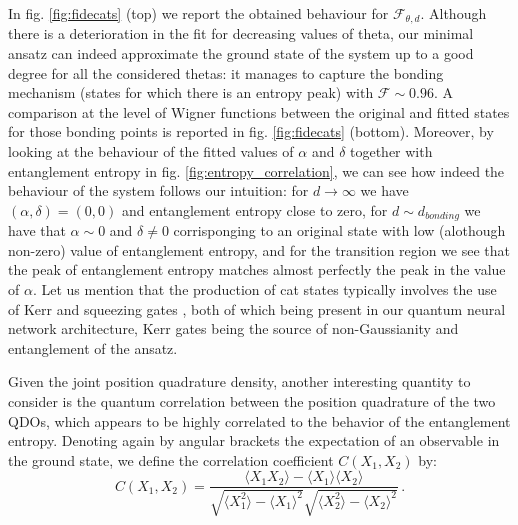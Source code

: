 \documentclass[reprint, amsmath, amssymb, floatfix, aps, pra]{revtex4-2}
\begin{document}
    In fig. \ref{fig:fidecats} (top) we report the obtained behaviour for $\mathcal{F}_{\theta, d}$. Although there is a deterioration in the fit for decreasing values of theta, our minimal ansatz can indeed approximate the ground state of the system up to a good degree for all the considered thetas: it manages to capture the bonding mechanism (states for which there is an entropy peak) with $\mathcal{F}\sim 0.96$. A comparison at the level of Wigner functions between the original and fitted states for those bonding points is reported in fig. \ref{fig:fidecats} (bottom). Moreover, by looking at the behaviour of the fitted values of $\alpha$ and $\delta$ together with entanglement entropy in fig. \ref{fig:entropy_correlation}, we can see how indeed the behaviour of the system follows our intuition: for $d\rightarrow\infty$ we have $(\alpha, \delta) = (0,0)$ and entanglement entropy close to zero, for $d\sim d_{bonding}$ we have that $\alpha \sim 0$ and $\delta\neq 0$ corrisponging to an original state with low (alothough non-zero) value of entanglement entropy, and for the transition region we see that the peak of entanglement entropy matches almost perfectly the peak in the value of $\alpha$. Let us mention that the production of cat states typically involves the use of Kerr and squeezing gates \cite{puri2017engineering, grimm2019kerr}, both of which being present in our quantum neural network architecture, Kerr gates being the source of non-Gaussianity and entanglement of the ansatz.

    Given the joint position quadrature density, another interesting quantity to consider is the quantum correlation between the position quadrature of the two QDOs, which appears to be highly correlated to the behavior of the entanglement entropy. Denoting again by angular brackets the expectation of an observable in the ground state, we define the correlation coefficient $C(X_1, X_2)$ by:
    \begin{equation*}
        C(X_1, X_2) = \frac{\langle X_1X_2\rangle - \langle X_1\rangle\langle X_2\rangle}{\sqrt{\langle X_1^2\rangle - \langle X_1\rangle^2}\sqrt{\langle X_2^2\rangle - \langle X_2\rangle^2}}\,.
    \end{equation*}
\end{document}
